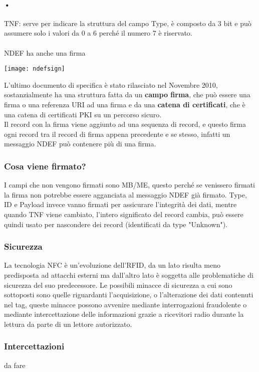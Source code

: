\paragraph{•}TNF: serve per indicare la struttura del campo Type, è composto da 3 bit e può assumere solo i valori da 0 a 6 perché il numero 7 è riservato.
\\\\NDEF ha anche una firma
\begin{center}
\texttt{[image: ndefsign]}
\end{center}
L'ultimo documento di specifica è stato rilasciato nel Novembre 2010, sostanzialmente ha una struttura fatta da un \textbf{campo firma}, che può essere una firma o una referenza URI ad una firma e da una \textbf{catena di certificati}, che è una catena di certificati PKI su un percorso sicuro.
\\Il record con la firma viene aggiunto ad una sequenza di record, e questo firma ogni record tra il record di firma appena precedente e se stesso, infatti un messaggio NDEF può contenere più di una firma.
\subsubsection{Cosa viene firmato?}
I campi che non vengono firmati sono MB/ME, questo perché se venissero firmati la firma non potrebbe essere agganciata al messaggio NDEF già firmato. Type, ID e Payload invece vanno firmati per assicurare l'integrità dei dati, mentre quando TNF viene cambiato, l'intero significato del record cambia, può essere quindi usato per nascondere dei record (identificati da type "Unknown"). 
\subsubsection{Sicurezza}
La tecnologia NFC è un'evoluzione dell'RFID, da un lato risulta meno predisposta ad attacchi esterni ma dall'altro lato è soggetta alle problematiche di sicurezza del suo predecessore. Le possibili minacce di sicurezza a cui sono sottoposti sono quelle riguardanti l'acquisizione, o l'alterazione dei dati contenuti nel tag, queste minacce possono avvenire mediante interrogazioni fraudolente o mediante intercettazione delle informazioni grazie a ricevitori radio durante la lettura da parte di un lettore autorizzato.
\subsubsection{Intercettazioni}
da fare

